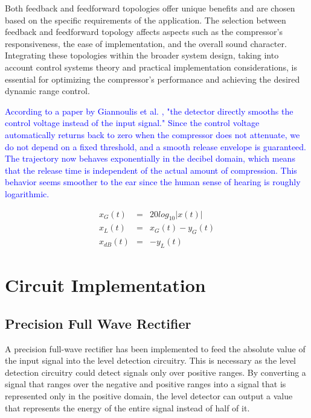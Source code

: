 \documentclass[10pt]{article}
\begin{document}
\begin{multicols}{2}
\begin{figure*}[!th]
                \end{figure*}

                Both feedback and feedforward topologies offer unique benefits and are chosen based on the specific requirements of the application. The selection between feedback and feedforward topology affects aspects such as the compressor's responsiveness, the ease of implementation, and the overall sound character. Integrating these topologies within the broader system design, taking into account control systems theory and practical implementation considerations, is essential for optimizing the compressor's performance and achieving the desired dynamic range control.\par
                \textcolor{blue}{According to a paper by Giannoulis et al. \cite{drc-tutorial}, "the detector directly smooths the control voltage instead of the input signal." Since the control voltage automatically returns back to zero when the compressor does not attenuate, we do not depend on a fixed threshold, and a smooth release envelope is guaranteed. The trajectory now behaves exponentially in the decibel domain, which means that the release time is independent of the actual amount of compression. This behavior seems smoother to the ear since the human sense of hearing is roughly logarithmic.} 

                \begin{eqnarray}
                    x_G(t)&=&20log_{10}|x(t)|\\
                    x_L(t)&=&x_G(t)-y_G(t)\\
                    x_{dB}(t)&=&-y_L(t)
                \end{eqnarray}
                        
        \section{Circuit Implementation}
            \subsection{Precision Full Wave Rectifier}
                A precision full-wave rectifier has been implemented to feed the absolute value of the input signal into the level detection circuitry. This is necessary as the level detection circuitry could detect signals only over positive ranges. By converting a signal that ranges over the negative and positive ranges into a signal that is represented only in the positive domain, the level detector can output a value that represents the energy of the entire signal instead of half of it.
                

\end{multicols}
\end{document}
